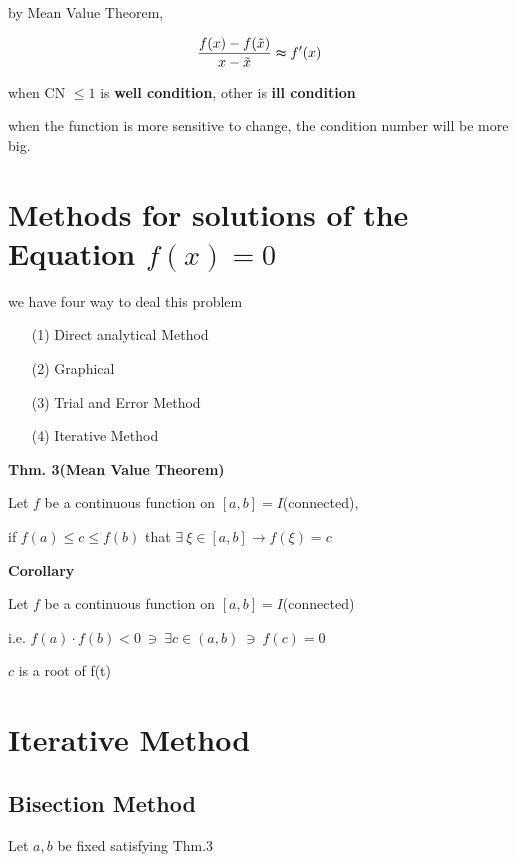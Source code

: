 by Mean Value Theorem,

$$\dfrac{f(x)-f(\tilde{x})}{x-\tilde{x}} \thickapprox f'(x)$$

when CN $\leq 1$ is \textbf{well condition}, other is \textbf{ill condition}

when the function is more sensitive to change, the condition number will be more big.

\newpage

\section{Methods for solutions of the Equation $f(x)=0$}

we have four way to deal this problem

\begin{enumerate}
	\item[(1)] Direct analytical Method
	\item[(2)] Graphical
	\item[(3)] Trial and Error Method
	\item[(4)] Iterative Method
\end{enumerate}

\textbf{Thm. 3(Mean Value Theorem)}

\begin{tcolorbox}
	Let $f$ be a continuous function on $[a,b] = I$(connected),
	
	if $f(a) \leq c \leq f(b)$ that $\exists~\xi \in [a,b] \rightarrow f(\xi) = c$
\end{tcolorbox}

\textbf{Corollary}


\begin{tcolorbox}
	Let $f$ be a continuous function on $[a,b] = I$(connected)
	
	i.e. $f(a) \cdot f(b) < 0 ~\ni~ \exists c \in (a,b) ~\ni~ f(c) = 0$
	
	$c$ is a root of f(t)
\end{tcolorbox}

\section*{Iterative Method}
\subsection{Bisection Method}$ $\\

Let $a,b$ be fixed satisfying Thm.3


